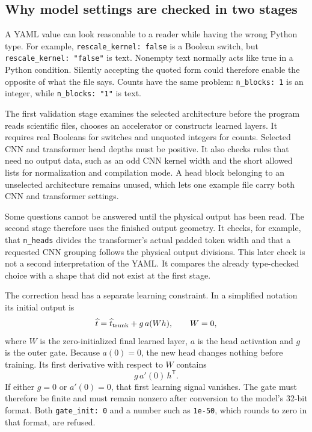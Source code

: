 \documentclass[10pt,aps,prd,twocolumn,nofootinbib]{revtex4-2}
\newcommand{\code}[1]{\texttt{#1}}
\begin{document}
\subsection{Why model settings are checked in two stages}
\label{sec:active-model-validation}

A YAML value can look reasonable to a reader while having the wrong Python
type.  For example, \code{rescale\_kernel: false} is a Boolean switch, but
\code{rescale\_kernel: "false"} is text.  Nonempty text normally acts like
true in a Python condition.  Silently accepting the quoted form could
therefore enable the opposite of what the file says.  Counts have the same
problem: \code{n\_blocks: 1} is an integer, while
\code{n\_blocks: "1"} is text.

The first validation stage examines the selected architecture before the
program reads scientific files, chooses an accelerator or constructs learned
layers.  It requires real Booleans for switches and unquoted integers for
counts.  Selected CNN and transformer head depths must be positive.  It also
checks rules that need no output data, such as an odd CNN kernel width and the
short allowed lists for normalization and compilation mode.  A
head block belonging to an unselected architecture remains unused, which lets
one example file carry both CNN and transformer settings.

Some questions cannot be answered until the physical output has been read.
The second stage therefore uses the finished output geometry.  It checks, for
example, that \code{n\_heads} divides the transformer's actual padded token
width and that a requested CNN grouping follows the physical output
divisions.  This later check is not a second interpretation of the YAML.  It
compares the already type-checked choice with a shape that did not exist at
the first stage.

The correction head has a separate learning constraint.  In a simplified
notation its initial output is
\begin{equation*}
  \widehat t
  = \widehat t_{\rm trunk} + g\,a(Wh),
  \qquad W=0,
\end{equation*}
where $W$ is the zero-initialized final learned layer, $a$ is the head
activation and $g$ is the outer gate.  Because $a(0)=0$, the new head changes
nothing before training.  Its first derivative with respect to $W$ contains
\begin{equation*}
  g\,a'(0)\,h^{\mathsf T}.
\end{equation*}
If either $g=0$ or $a'(0)=0$, that first learning signal vanishes.  The gate
must therefore be finite and must remain nonzero after conversion to the
model's 32-bit format.  Both \code{gate\_init: 0} and a number such as
\code{1e-50}, which rounds to zero in that format, are refused.
\end{document}
